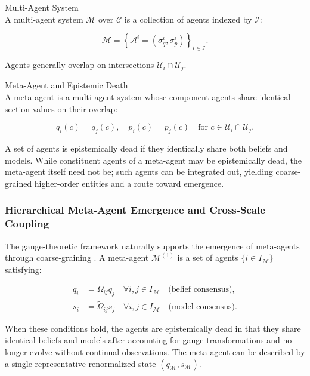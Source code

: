 \documentclass[twoside,11pt]{article}
\begin{document}
Multi-Agent System\\
A multi-agent system $\mathcal{M}$ over $\mathcal{C}$ is a collection of agents indexed by $\mathcal{I}$:

\begin{equation}
\mathcal{M} = \left\{\mathcal{A}^i = \left(\sigma^i_q, \sigma^i_p\right)\right\}_{i \in \mathcal{I}}.
\end{equation}

Agents generally overlap on intersections $\mathcal{U}_i \cap \mathcal{U}_j$.

Meta-Agent and Epistemic Death\\
A meta-agent is a multi-agent system whose component agents share identical section values on their overlap:

\begin{equation}
q_i(c) = q_j(c), \quad p_i(c) = p_j(c) \quad \text{for } c \in \mathcal{U}_i \cap \mathcal{U}_j.
\end{equation}

A set of agents is epistemically dead if they identically share both beliefs and models. While constituent agents of a meta-agent may be epistemically dead, the meta-agent itself need not be; such agents can be integrated out, yielding coarse-grained higher-order entities and a route toward emergence.

\subsubsection{Hierarchical Meta-Agent Emergence and Cross-Scale Coupling}
\label{sec:appendix_meta_agent}

The gauge-theoretic framework naturally supports the emergence of meta-agents through coarse-graining \citep{shen2008coarse}. A meta-agent $\mathcal{M}^{(1)}$ is a set of agents $\{i \in I_{\mathcal{M}}\}$ satisfying:

\begin{align}
q_i &= \Omega_{ij} q_j \quad \forall i,j \in I_{\mathcal{M}} \quad \text{(belief consensus)}, \label{eq:belief_consensus} \\
s_i &= \tilde{\Omega}_{ij} s_j \quad \forall i,j \in I_{\mathcal{M}} \quad \text{(model consensus)}. \label{eq:model_consensus}
\end{align}

When these conditions hold, the agents are epistemically dead in that they share identical beliefs and models after accounting for gauge transformations and no longer evolve without continual observations. The meta-agent can be described by a single representative renormalized state $(q_{\mathcal{M}}, s_{\mathcal{M}})$.
\end{document}
